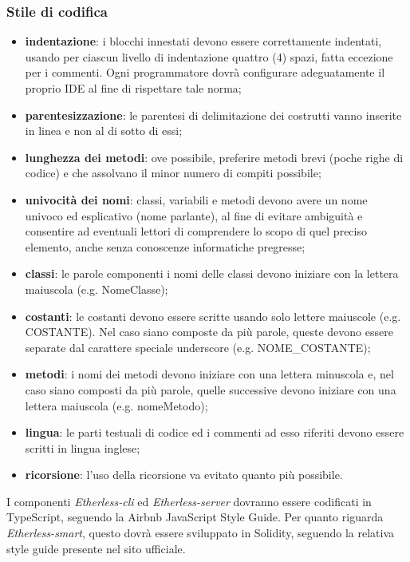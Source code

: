     	\subsubsection*{Stile di codifica}     
   \begin{itemize}
         \item{\textbf{indentazione}: i blocchi innestati devono essere correttamente indentati, usando per ciascun livello di indentazione quattro (4) spazi, fatta eccezione per i commenti. Ogni programmatore dovrà configurare adeguatamente il proprio IDE al fine di rispettare tale norma;}
		\item{\textbf{parentesizzazione}: le parentesi di delimitazione dei costrutti vanno inserite in linea e non al di sotto di essi;}
		\item{\textbf{lunghezza dei metodi}: ove possibile, preferire metodi brevi (poche righe di codice) e che assolvano il minor numero di compiti possibile;}
		\item{\textbf{univocità dei nomi}: classi, variabili e metodi devono avere un nome univoco ed esplicativo (nome parlante), al fine di evitare ambiguità e consentire ad eventuali lettori di comprendere lo scopo di quel preciso elemento, anche senza conoscenze informatiche pregresse;}
		\item{\textbf{classi}: le parole componenti i nomi delle classi devono iniziare con la lettera maiuscola (e.g. NomeClasse);}
		\item{\textbf{costanti}: le costanti devono essere scritte usando solo lettere maiuscole (e.g. COSTANTE). Nel caso siano composte da più parole, queste devono essere separate dal carattere speciale underscore (e.g. NOME\_COSTANTE);}
		\item{\textbf{metodi}: i nomi dei metodi devono iniziare con una lettera minuscola e, nel caso 	siano composti da più parole, quelle successive devono iniziare con una lettera maiuscola (e.g. nomeMetodo);}
		\item{\textbf{lingua}: le parti testuali di codice ed i commenti ad esso riferiti devono essere scritti in lingua inglese;}
        \item{\textbf{ricorsione}: l'uso della ricorsione va evitato quanto più possibile.}
	\end{itemize}
	
	\noindent I componenti \textit{Etherless-cli} ed \textit{Etherless-server} dovranno essere codificati in TypeScript, seguendo la Airbnb JavaScript Style Guide. 
	Per quanto riguarda \textit{Etherless-smart}, questo dovrà essere sviluppato in Solidity, seguendo la relativa style guide presente nel sito ufficiale. 
	
